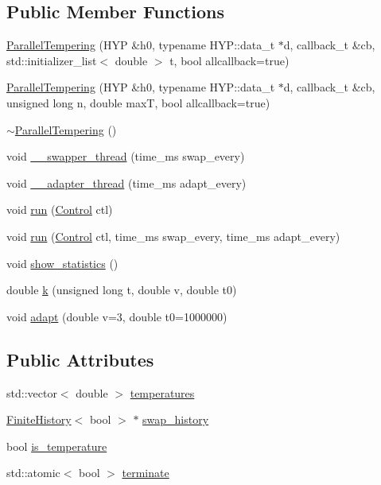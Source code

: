 \subsection*{Public Member Functions}
\begin{DoxyCompactItemize}
\item 
\hyperlink{class_parallel_tempering_aec98f6abe3a51a3cf79b508ba176d290}{Parallel\+Tempering} (H\+YP \&h0, typename H\+Y\+P\+::data\+\_\+t $\ast$d, callback\+\_\+t \&cb, std\+::initializer\+\_\+list$<$ double $>$ t, bool allcallback=true)
\item 
\hyperlink{class_parallel_tempering_a28bc2e02ad875e2b1cfcde9e428bf97e}{Parallel\+Tempering} (H\+YP \&h0, typename H\+Y\+P\+::data\+\_\+t $\ast$d, callback\+\_\+t \&cb, unsigned long n, double maxT, bool allcallback=true)
\item 
\hyperlink{class_parallel_tempering_a96763c107a95f4a120f2b65c896cb5b2}{$\sim$\+Parallel\+Tempering} ()
\item 
void \hyperlink{class_parallel_tempering_aa704d462a41cb45b461b967a97dedcbb}{\+\_\+\+\_\+swapper\+\_\+thread} (time\+\_\+ms swap\+\_\+every)
\item 
void \hyperlink{class_parallel_tempering_a6ae6bd8581ec13aad5983886b1a739e6}{\+\_\+\+\_\+adapter\+\_\+thread} (time\+\_\+ms adapt\+\_\+every)
\item 
void \hyperlink{class_parallel_tempering_a5332ab465d8ec7a1d882e393a416a1f0}{run} (\hyperlink{struct_control}{Control} ctl)
\item 
void \hyperlink{class_parallel_tempering_ac8f4d01107b5f6a429179a1ad5d22896}{run} (\hyperlink{struct_control}{Control} ctl, time\+\_\+ms swap\+\_\+every, time\+\_\+ms adapt\+\_\+every)
\item 
void \hyperlink{class_parallel_tempering_a9e1960158b12a4dadfab54eb4fb895d3}{show\+\_\+statistics} ()
\item 
double \hyperlink{class_parallel_tempering_a439c50d3f616319803d4ab83804d1ae0}{k} (unsigned long t, double v, double t0)
\item 
void \hyperlink{class_parallel_tempering_a673feff316b65cad63f56ceb81b128ae}{adapt} (double v=3, double t0=1000000)
\end{DoxyCompactItemize}
\subsection*{Public Attributes}
\begin{DoxyCompactItemize}
\item 
std\+::vector$<$ double $>$ \hyperlink{class_parallel_tempering_a5aca1e6ca522986f183d61c91c94d21d}{temperatures}
\item 
\hyperlink{class_finite_history}{Finite\+History}$<$ bool $>$ $\ast$ \hyperlink{class_parallel_tempering_af9ae9446ae4d22c0a26755f3d3a1d86a}{swap\+\_\+history}
\item 
bool \hyperlink{class_parallel_tempering_ae9f0a2af938df838cc4010983860394e}{is\+\_\+temperature}
\item 
std\+::atomic$<$ bool $>$ \hyperlink{class_parallel_tempering_acda523b375468743e7d8ac471af65285}{terminate}
\end{DoxyCompactItemize}
